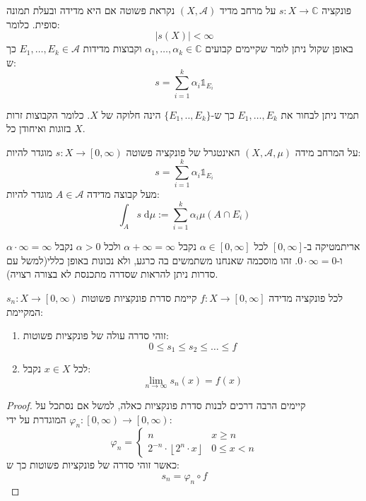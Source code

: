 \documentclass{tstextbook}
\begin{document}
\begin{definition}
פונקציה \(s:X\to \mathbb{C}\) על מרחב מדיד \(\left( X,\mathcal{A} \right)\) נקראת פשוטה אם היא מדידה ובעלת תמונה סופית. כלומר:
$$\lvert s(X) \rvert <\infty$$
באופן שקול ניתן לומר שקיימים קבועים \(\alpha_{1},\dots,\alpha_{k}\in \mathbb{C}\) וקבוצות מדידות \(E_{1},\dots,E_{k}\in \mathcal{A}\) כך ש:
$$s=\sum_{i=1}^{k}\alpha_{i}\mathbb{1} _{E_{i}}$$

\end{definition}
\begin{remark}
תמיד ניתן לבחור את \(E_{1},\dots,E_{k}\) כך ש-\(\{ E_{1},..,E_{k} \}\) הינה חלוקה של \(X\). כלומר הקבוצות זרות בזוגות ואיחודן כל \(X\).

\end{remark}
\begin{definition}
על המרחב מידה \(\left( X,\mathcal{A},\mu \right)\) האינטגרל של פונקציה פשוטה \(s:X\to \left[ 0,\infty \right)\) מוגדר להיות:
$$s=\sum_{i=1}^{k} \alpha_{i}\mathbb{1} _{E_{i}}$$
מעל קבוצה מדידה \(A\in \mathcal{A}\) מוגדר להיות:
$$\int_{A} s\;\mathrm{d}\mu:= \sum_{i=1}^{k} \alpha_{i}\mu\left( A\cap E_{i} \right)$$

\end{definition}
\begin{remark}
אריתמטיקה ב-\(\left[ 0,\infty \right]\) לכל \(\alpha \in \left[ 0,\infty \right]\) נקבל \(\alpha+\infty=\infty\) ולכל \(\alpha>0\) נקבל \(\alpha\cdot \infty=\infty\) ו-\(0\cdot \infty = 0\). זהו מוסכמה שאנחנו משתמשים בה כרגע, ולא נכונות באופן כללי(למשל עם סדרות ניתן להראות שסדרה מתכנסת לא בצורה רצויה).

\end{remark}
\begin{proposition}
לכל פונקציה מדידה \(f:X\to \left[ 0,\infty \right]\) קיימת סדרת פונקציות פשוטות \(s_{n}:X\to \left[ 0,\infty \right)\) המקיימת:

  \begin{enumerate}
    \item זוהי סדרה עולה של פונקציות פשוטות: 
$$0\leq s_{1} \leq s_{2} \leq \dots \leq f$$


    \item לכל \(x \in X\) נקבל: 
$$\lim_{ n \to \infty } s_{n}(x)=f(x)$$


  \end{enumerate}
\end{proposition}
\begin{proof}
קיימים הרבה דרכים לבנות סדרת פונקציות כאלה, למשל אם נסתכל על \(\varphi_{n}:\left[ 0,\infty \right)\to\left[ 0,\infty \right)\) המוגדרת על ידי:
$$\varphi_{n}=\begin{cases}n  & x\geq n \\2^{-n}\cdot \left\lfloor  2^{n}\cdot x  \right\rfloor  & 0\leq x < n
\end{cases}$$
כאשר זוהי סדרה של פונקציות פשוטות כך ש:
$$s_{n}=\varphi_{n}\circ  f$$

\end{proof}
\end{document}
